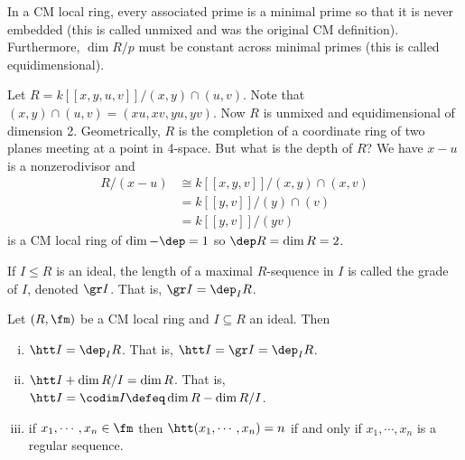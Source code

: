 \begin{cor}
In a CM local ring, every associated prime is a minimal prime so that it is never embedded (this is called unmixed and was the original CM definition). Furthermore, $\dim R/p$ must be constant across minimal primes (this is called equidimensional). 
\end{cor}

\begin{ex}
Let $R=k[[x,y,u,v]]/(x,y) \cap (u,v)$. Note that $(x,y) \cap (u,v)=(xu,xv,yu,yv)$. Now $R$ is unmixed and equidimensional of dimension 2. Geometrically, $R$ is the completion of a coordinate ring of two planes meeting at a point in 4-space. But what is the depth of $R$? We have $x-u$ is a nonzerodivisor and 
\[
\begin{split}
R/(x-u) &\cong k[[x,y,v]]/(x,y) \cap (x,v) \\
&=k[[y,v]]/(y) \cap (v) \\
&=k[[y,v]]/(yv)
\end{split}
\]
is a CM local ring of $\dim-\dep=1$ so $\dep R=\dim R=2$.
\end{ex}

\begin{dfn}[Grade]
If $I \leq R$ is an ideal, the length of a maximal $R$-sequence in $I$ is called the grade of $I$, denoted $\gr I$. That is, $\gr I=\dep_I R$.
\end{dfn}

\begin{thmm}
Let $(R,\fm)$ be a CM local ring and $I \subseteq R$ an ideal. Then 
\begin{enumerate}[(i)]
\item $\htt I=\dep_I R$. That is, $\htt I=\gr I=\dep_I R$.
\item $\htt I + \dim R/I = \dim R$. That is, $\htt I=\codim I \defeq \dim R-\dim R/I$.
\item if $x_1,\cdots,x_n \in \fm$ then $\htt(x_1,\cdots,x_n)=n$ if and only if $x_1,\cdots,x_n$ is a regular sequence. 
\end{enumerate}
\end{thmm}

